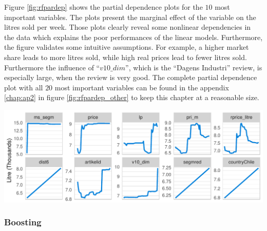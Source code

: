 \documentclass[11pt,]{article}
\let\origfigure\figure
\let\endorigfigure\endfigure
\renewenvironment{figure}[1][2] {
    \expandafter\origfigure\expandafter[H]
} {
    \endorigfigure
}
\begin{document}
Figure \ref{fig:rfpardep} shows the partial dependence plots for the
\(10\) most important variables. The plots present the marginal effect
of the variable on the litres sold per week. Those plots clearly reveal
some nonlinear dependencies in the data which explains the poor
performances of the linear models. Furthermore, the figure validates
some intuitive assumptions. For example, a higher market share leads to
more litres sold, while high real prices lead to fewer litres sold.
Furthermore the influence of \enquote{\(v10\_dim\)}, which is the
\enquote{Dagens Industri} review, is especially large, when the review
is very good. The complete partial dependence plot with all \(20\) most
important variables can be found in the appendix \ref{chap:ap2} in
figure \ref{fig:rfpardep_other} to keep this chapter at a reasonable
size.

\begin{figure}
\centering
\includegraphics{../00_data/output_paper/11_par_dep_random_forest.pdf}
\caption{\label{fig:rfpardep}Random Forest: Partial Dependence Plots.}
\end{figure}

\hypertarget{boosting}{%
\subsubsection{Boosting}\label{boosting}}
\end{document}
